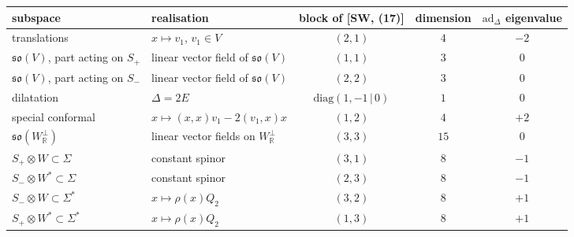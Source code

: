 \begin{tabular}{l|l|c|c|c}
subspace & realisation & block of [SW, (17)] & dimension & $\mathrm{ad}_\Delta$ eigenvalue \\
\hline
translations & $x\mapsto v_1$, $v_1\in V$ & $(2,1)$ & $4$ & $-2$ \\
$\mathfrak{so}(V)$, part acting on $S_+$ & linear vector field of $\mathfrak{so}(V)$ & $(1,1)$ & $3$ & $0$ \\
$\mathfrak{so}(V)$, part acting on $S_-$ & linear vector field of $\mathfrak{so}(V)$ & $(2,2)$ & $3$ & $0$ \\
dilatation & $\Delta=2E$ & $\mathrm{diag}(1,-1\,|\,0)$ & $1$ & $0$ \\
special conformal & $x\mapsto(x,x)v_1-2(v_1,x)x$ & $(1,2)$ & $4$ & $+2$ \\
$\mathfrak{so}(W_{\mathbb R}^\perp)$ & linear vector fields on $W_{\mathbb R}^\perp$ & $(3,3)$ & $15$ & $0$ \\
$S_+\otimes W\subset\Sigma$ & constant spinor & $(3,1)$ & $8$ & $-1$ \\
$S_-\otimes W^*\subset\Sigma$ & constant spinor & $(2,3)$ & $8$ & $-1$ \\
$S_-\otimes W\subset\Sigma^*$ & $x\mapsto\rho(x)Q_2$ & $(3,2)$ & $8$ & $+1$ \\
$S_+\otimes W^*\subset\Sigma^*$ & $x\mapsto\rho(x)Q_2$ & $(1,3)$ & $8$ & $+1$ \\
\end{tabular}

